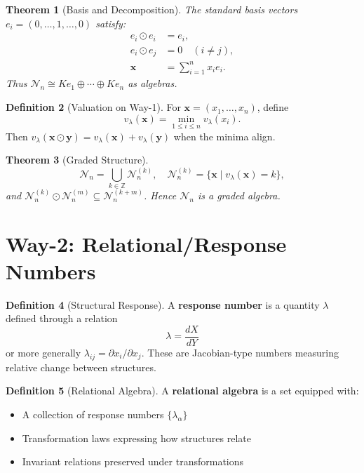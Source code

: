 \documentclass[12pt, reqno]{amsart}
\theoremstyle{plain}
\newtheorem{theorem}{Theorem}[section]
\theoremstyle{definition}
\newtheorem{definition}[theorem]{Definition}
\theoremstyle{remark}
\newcommand{\cN}{\mathcal{N}}
\newcommand{\bZ}{\mathbb{Z}}
\newcommand{\val}{v_{\lambda}}
\begin{document}
\begin{theorem}[Basis and Decomposition]
The standard basis vectors $e_i = (0,\ldots,1,\ldots,0)$ satisfy:
\begin{align*}
e_i \odot e_i &= e_i, \\
e_i \odot e_j &= 0 \quad (i \neq j), \\
\mathbf{x} &= \sum_{i=1}^{n} x_i e_i.
\end{align*}
Thus $\cN_n \cong Ke_1 \oplus \cdots \oplus Ke_n$ as algebras.
\end{theorem}

\begin{definition}[Valuation on Way-1]
For $\mathbf{x} = (x_1,\ldots,x_n)$, define
\[
\val(\mathbf{x}) = \min_{1\leq i\leq n} \val(x_i).
\]
Then $\val(\mathbf{x} \odot \mathbf{y}) = \val(\mathbf{x}) + \val(\mathbf{y})$ when the minima align.
\end{definition}

\begin{theorem}[Graded Structure]
\[
\cN_n = \bigcup_{k\in\bZ} \cN_n^{(k)}, \quad \cN_n^{(k)} = \{ \mathbf{x} \mid \val(\mathbf{x}) = k \},
\]
and $\cN_n^{(k)} \odot \cN_n^{(m)} \subseteq \cN_n^{(k+m)}$. Hence $\cN_n$ is a graded algebra.
\end{theorem}

\section{Way-2: Relational/Response Numbers}

\begin{definition}[Structural Response]
A \textbf{response number} is a quantity $\lambda$ defined through a relation
\[
\lambda = \frac{dX}{dY}
\]
or more generally $\lambda_{ij} = \partial x_i / \partial x_j$. These are Jacobian-type numbers
measuring relative change between structures.
\end{definition}

\begin{definition}[Relational Algebra]
A \textbf{relational algebra} is a set equipped with:
\begin{itemize}
    \item A collection of response numbers $\{\lambda_{\alpha}\}$
    \item Transformation laws expressing how structures relate
    \item Invariant relations preserved under transformations
\end{itemize}
\end{definition}
\end{document}
